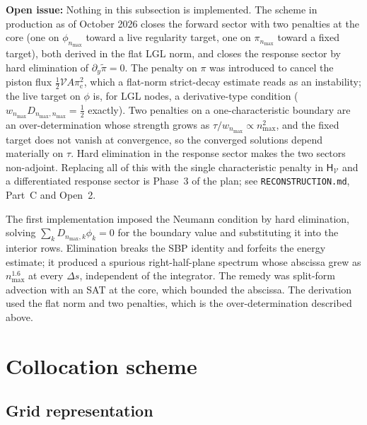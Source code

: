 \documentclass[a4paper,11pt]{article}
\newcommand{\semibold}[1]{{\fontseries{b}\selectfont{#1}}}
\newenvironment{panel}{\begin{tcolorbox}[enhanced,breakable,colback=gray!10,colframe=gray!30]\small}{\end{tcolorbox}}
\newenvironment{todo}{\begin{tcolorbox}[enhanced,breakable,colback=SussexBurntOrange!10,colframe=SussexBurntOrange!40]\small{\textsf{\textbf{Open issue:} }}}{\end{tcolorbox}}
\newcommand{\field}{\phi}                    %
\newcommand{\mom}{\pi}                       %
\newcommand{\rmom}{\widetilde\mom}           %
\newcommand{\yco}{y}                         %
\newcommand{\Deltas}{\Delta s}                %
\newcommand{\advcoef}{A}                     %
\newcommand{\modeidx}{n}                     %
\newcommand{\volel}{\mathcal{V}}             %
\newcommand{\Hnorm}{\mathsf{H}}               %
\newcommand{\core}{\mathrm{c}}                %
\begin{document}
\begin{todo}
Nothing in this subsection is implemented. The scheme in production as of
October 2026 closes the forward sector with two penalties at the core (one
on $\field_{\modeidx_{\max}}$ toward a live regularity target, one on
$\mom_{\modeidx_{\max}}$ toward a fixed target), both derived in the flat
LGL norm, and closes the response sector by hard elimination of
$\partial_\yco\rmom=0$. The penalty on $\mom$ was introduced to cancel the
piston flux $\tfrac12\volel\advcoef\mom_\core^2$, which a flat-norm
strict-decay estimate reads as an instability; the live target on $\field$
is, for LGL nodes, a derivative-type condition
($w_{\modeidx_{\max}}D_{\modeidx_{\max},\modeidx_{\max}}=\tfrac12$ exactly).
Two penalties on a one-characteristic boundary are an over-determination
whose strength grows as $\tau/w_{\modeidx_{\max}}\propto\modeidx_{\max}^2$,
and the fixed target does not vanish at convergence, so the converged
solutions depend materially on $\tau$. Hard elimination in the response
sector makes the two sectors non-adjoint. Replacing all of this with the
single characteristic penalty in $\Hnorm_\volel$ and a differentiated
response sector is Phase~3 of the plan; see \texttt{RECONSTRUCTION.md},
Part~C and Open~2.
\end{todo}

\begin{panel}
\semibold{Historical: hard elimination and the first SAT.} The first
implementation imposed the Neumann condition by hard elimination,
solving $\sum_k D_{\modeidx_{\max},k}\field_k=0$ for the boundary value and
substituting it into the interior rows. Elimination breaks the SBP
identity and forfeits the energy estimate; it produced a spurious
right-half-plane spectrum whose abscissa grew as
$\modeidx_{\max}^{1.6}$ at every $\Deltas$, independent of the integrator.
The remedy was split-form advection with an SAT at the core, which bounded
the abscissa. The derivation used the flat norm and two penalties, which is
the over-determination described above.
\end{panel}
\section{Collocation scheme}
\label{sec:collocation-scheme}

\subsection{Grid representation}
\end{document}
